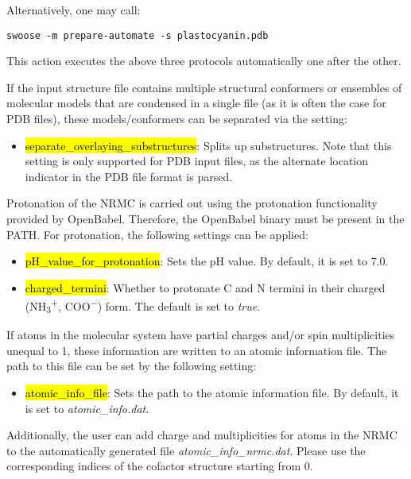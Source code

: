 \documentclass[]{tufte-book}
\begin{document}
{{Alternatively, one may call:
\begin{mdframed}[backgroundcolor=LightSteelBlue!25, linewidth=0pt]
\begin{verbatim}
swoose -m prepare-automate -s plastocyanin.pdb 
\end{verbatim}
\end{mdframed}

This action executes the above three protocols automatically one after the other. 

If the input structure file contains multiple structural conformers or ensembles of molecular models that are condensed in a single file (as it is often the case for PDB files), these models/conformers can be separated via the setting:
\begin{itemize}
\item \hl{separate\_overlaying\_substructures}: Splits up substructures. Note that this setting is only supported for PDB input files, as the alternate location indicator in the PDB file format is parsed.
\end{itemize} 
Protonation of the NRMC is carried out using the protonation functionality provided by OpenBabel. Therefore, the OpenBabel binary must be present in the PATH. For protonation, the following settings can be applied:

\begin{itemize}
\item \hl{pH\_value\_for\_protonation}: Sets the pH value. By default, it is set to 7.0.  
\item \hl{charged\_termini}: Whether to protonate C and N termini in their charged (NH\textsubscript{3}\textsuperscript{+}, COO\textsuperscript{$-$}) form. The default is set to \textit{true}. 
\end{itemize} 

If atoms in the molecular system have partial charges and/or spin multiplicities unequal to 1, these information are written to an atomic information file. The path to this file can be set by the following setting:

\begin{itemize}
\item \hl{atomic\_info\_file}: Sets the path to the atomic information file. By default, it is set to \textit{atomic\_info.dat}. 
\end{itemize}
Additionally, the user can add charge and multiplicities for atoms in the NRMC to the automatically generated file \textit{atomic\_info\_nrmc.dat}. Please use the corresponding indices of the cofactor structure starting from 0.  

}}
\end{document}
